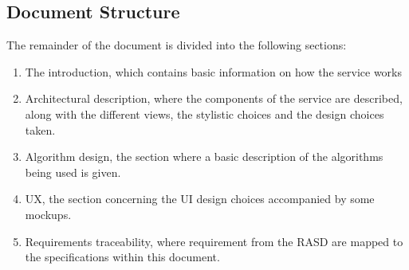 \subsection{Document Structure}
	The remainder of the document is divided into the following sections:
	\begin{enumerate}
	\item The introduction, which contains basic information on how the service works
	\item Architectural description, where the components of the service are described, along with the different views, the stylistic choices and the design choices taken. 
	\item Algorithm design, the section where a basic description of the algorithms being used is given.
	\item UX, the section concerning the UI design choices accompanied by some mockups.
	\item Requirements traceability, where requirement from the RASD are mapped to the specifications within this document.
	\end{enumerate}
